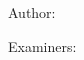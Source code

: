 \restoregeometry


\hfill
\vfill

\noindent \textit{\printTitle} 

\bigskip

\noindent Author:\\
{\printAuthor}

\medskip

\noindent Examiners: \\
{\printSupervisor}\\
{\printAffSupervisor}
